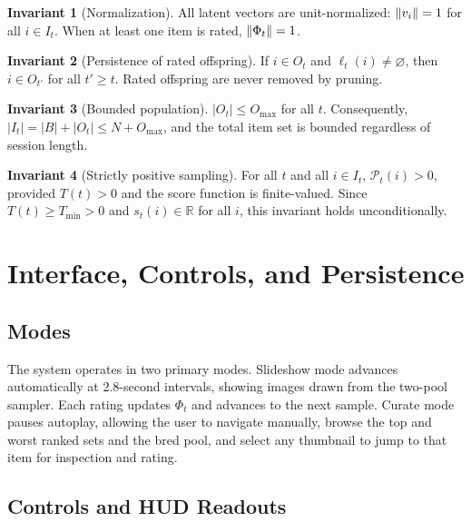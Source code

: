 \documentclass[12pt, a4paper]{article}
\DeclarePairedDelimiter{\norm}{\lVert}{\rVert}
\theoremstyle{definition}
\newtheorem{invariant}{Invariant}[section]
\begin{document}
\begin{invariant}[Normalization]
All latent vectors are unit-normalized: $\norm{v_i} = 1$ for all $i \in I_t$. When at least one item is rated, $\norm{\Phi_t} = 1$.
\end{invariant}

\begin{invariant}[Persistence of rated offspring]
If $i \in O_t$ and $\ell_t(i) \neq \varnothing$, then $i \in O_{t'}$ for all $t' \ge t$. Rated offspring are never removed by pruning.
\end{invariant}

\begin{invariant}[Bounded population]
$|O_t| \le O_{\max}$ for all $t$. Consequently, $|I_t| = |B| + |O_t| \le N + O_{\max}$, and the total item set is bounded regardless of session length.
\end{invariant}

\begin{invariant}[Strictly positive sampling]
For all $t$ and all $i \in I_t$, $\mathcal{P}_t(i) > 0$, provided $T(t) > 0$ and the score function is finite-valued. Since $T(t) \ge T_{\min} > 0$ and $s_t(i) \in \mathbb{R}$ for all $i$, this invariant holds unconditionally.
\end{invariant}

\section{Interface, Controls, and Persistence}

\subsection{Modes}

The system operates in two primary modes. Slideshow mode advances automatically at 2.8-second intervals, showing images drawn from the two-pool sampler. Each rating updates $\Phi_t$ and advances to the next sample. Curate mode pauses autoplay, allowing the user to navigate manually, browse the top and worst ranked sets and the bred pool, and select any thumbnail to jump to that item for inspection and rating.

\subsection{Controls and HUD Readouts}
\end{document}
